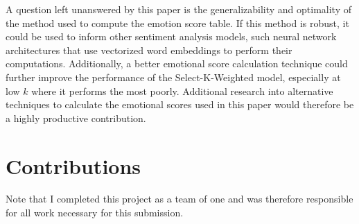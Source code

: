 \documentclass[11pt]{article}
\begin{document}
A question left unanswered by this paper is the generalizability and optimality of the method used to compute the emotion score table. If this method is robust, it could be used to inform other sentiment analysis models, such neural network architectures that use vectorized word embeddings to perform their computations. Additionally, a better emotional score calculation technique could further improve the performance of the Select-K-Weighted model, especially at low $k$ where it performs the most poorly. Additional research into alternative techniques to calculate the emotional scores used in this paper would therefore be a highly productive contribution.
\section{Contributions}
Note that I completed this project as a team of one and was therefore responsible for all work necessary for this submission.



\end{document}
